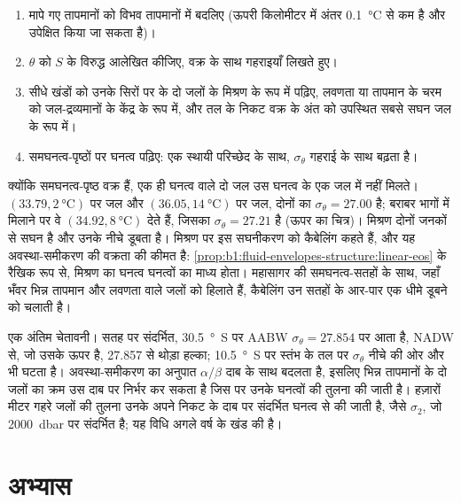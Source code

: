 \begin{method}[T–S आरेख पर जल-द्रव्यमान पढ़ना]\label{met:b1:fluid-envelopes-structure:ts}
\begin{enumerate}
  \item मापे गए तापमानों को विभव तापमानों में बदलिए (ऊपरी किलोमीटर में अंतर \qty{0.1}{\celsius} से कम है और उपेक्षित किया जा सकता है)।
  \item $\theta$ को $S$ के विरुद्ध आलेखित कीजिए, वक्र के साथ गहराइयाँ लिखते हुए।
  \item सीधे खंडों को उनके सिरों पर के दो जलों के मिश्रण के रूप में पढ़िए, लवणता या तापमान के चरम को जल-द्रव्यमानों के केंद्र के रूप में, और तल के निकट वक्र के अंत को उपस्थित सबसे सघन जल के रूप में।
  \item समघनत्व-पृष्ठों पर घनत्व पढ़िए: एक स्थायी परिच्छेद के साथ, $\sigma_\theta$ गहराई के साथ बढ़ता है।
\end{enumerate}
\end{method}

क्योंकि समघनत्व-पृष्ठ वक्र हैं, एक ही घनत्व वाले दो जल उस घनत्व के एक जल में नहीं मिलते। $(33.79, \qty{2}{\celsius})$ पर जल और $(36.05, \qty{14}{\celsius})$ पर जल, दोनों का $\sigma_\theta = 27.00$ है; बराबर भागों में मिलाने पर वे $(34.92, \qty{8}{\celsius})$ देते हैं, जिसका $\sigma_\theta = 27.21$ है (ऊपर का चित्र)। मिश्रण दोनों जनकों से सघन है और उनके नीचे डूबता है। मिश्रण पर इस सघनीकरण को कैबेलिंग कहते हैं, और यह अवस्था-समीकरण की वक्रता की कीमत है: \cref{prop:b1:fluid-envelopes-structure:linear-eos} के रैखिक रूप से, मिश्रण का घनत्व घनत्वों का माध्य होता। महासागर की समघनत्व-सतहों के साथ, जहाँ भँवर भिन्न तापमान और लवणता वाले जलों को हिलाते हैं, कैबेलिंग उन सतहों के आर-पार एक धीमे डूबने को चलाती है।

एक अंतिम चेतावनी। सतह पर संदर्भित, \qty{30.5}{\degree S} पर AABW $\sigma_\theta = 27.854$ पर आता है, NADW से, जो उसके ऊपर है, \num{27.857} से थोड़ा हल्का; \qty{10.5}{\degree S} पर स्तंभ के तल पर $\sigma_\theta$ नीचे की ओर और भी घटता है। अवस्था-समीकरण का अनुपात $\alpha/\beta$ दाब के साथ बदलता है, इसलिए भिन्न तापमानों के दो जलों का क्रम उस दाब पर निर्भर कर सकता है जिस पर उनके घनत्वों की तुलना की जाती है। हज़ारों मीटर गहरे जलों की तुलना उनके अपने निकट के दाब पर संदर्भित घनत्व से की जाती है, जैसे $\sigma_2$, जो \qty{2000}{dbar} पर संदर्भित है; यह विधि अगले वर्ष के खंड की है।

\section{अभ्यास}

